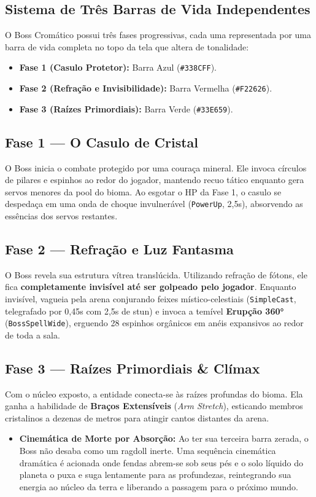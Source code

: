 \documentclass[a4paper,12pt]{report}
\begin{document}
\subsection{Sistema de Três Barras de Vida Independentes}
O Boss Cromático possui três fases progressivas, cada uma representada por uma barra de vida completa no topo da tela que altera de tonalidade:
\begin{itemize}
    \item \textbf{Fase 1 (Casulo Protetor):} Barra Azul (\texttt{\#338CFF}).
    \item \textbf{Fase 2 (Refração e Invisibilidade):} Barra Vermelha (\texttt{\#F22626}).
    \item \textbf{Fase 3 (Raízes Primordiais):} Barra Verde (\texttt{\#33E659}).
\end{itemize}

\subsection{Fase 1 --- O Casulo de Cristal}
O Boss inicia o combate protegido por uma couraça mineral. Ele invoca círculos de pilares e espinhos ao redor do jogador, mantendo recuo tático enquanto gera servos menores da pool do bioma. Ao esgotar o HP da Fase 1, o casulo se despedaça em uma onda de choque invulnerável (\texttt{PowerUp}, 2,5s), absorvendo as essências dos servos restantes.

\subsection{Fase 2 --- Refração e Luz Fantasma}
O Boss revela sua estrutura vítrea translúcida. Utilizando refração de fótons, ele fica \textbf{completamente invisível até ser golpeado pelo jogador}. Enquanto invisível, vagueia pela arena conjurando feixes místico-celestiais (\texttt{SimpleCast}, telegrafado por 0,45s com 2,5s de stun) e invoca a temível \textbf{Erupção 360°} (\texttt{BossSpellWide}), erguendo 28 espinhos orgânicos em anéis expansivos ao redor de toda a sala.

\subsection{Fase 3 --- Raízes Primordiais \& Clímax}
Com o núcleo exposto, a entidade conecta-se às raízes profundas do bioma. Ela ganha a habilidade de \textbf{Braços Extensíveis} (\textit{Arm Stretch}), esticando membros cristalinos a dezenas de metros para atingir cantos distantes da arena.
\begin{itemize}
    \item \textbf{Cinemática de Morte por Absorção:} Ao ter sua terceira barra zerada, o Boss não desaba como um ragdoll inerte. Uma sequência cinemática dramática é acionada onde fendas abrem-se sob seus pés e o solo líquido do planeta o puxa e suga lentamente para as profundezas, reintegrando sua energia ao núcleo da terra e liberando a passagem para o próximo mundo.
\end{itemize}
\end{document}
